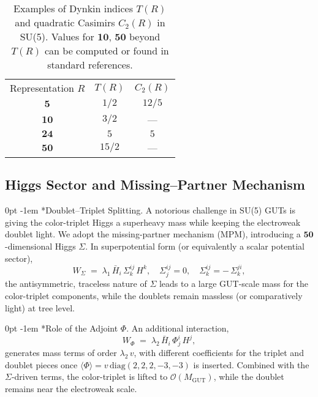 \documentclass[aps,prd,preprint,groupedaddress]{revtex4-2}
\makeatletter
\renewcommand{\paragraph}[1]{%
  \@startsection{paragraph}{4}{\z@}%
    {0pt}%
    {-1em}%
    {\normalfont\normalsize\itshape}*{#1}}
\makeatother
\begin{document}
\begin{table}[h!]
\centering
\begin{tabular}{c|c|c}
\toprule
Representation $R$ & $T(R)$ & $C_{2}(R)$ \\
$\mathbf{5}$ & $1/2$ & $12/5$ \\
$\mathbf{10}$ & $3/2$ & --- \\[3pt]
$\mathbf{24}$ & $5$ & $5$ \\[3pt]
$\mathbf{50}$ & $15/2$ & --- \\
\end{tabular}
\caption{Examples of Dynkin indices $T(R)$ and quadratic Casimirs $C_{2}(R)$ in SU(5).  
Values for $\mathbf{10}$, $\mathbf{50}$ beyond $T(R)$ can be computed or found in standard references.}
\label{tab:Indices}
\end{table}

\subsection{Higgs Sector and Missing--Partner Mechanism}
\label{subsec:higgs-mpm}

\paragraph{Doublet--Triplet Splitting.}
A notorious challenge in SU(5) GUTs is giving the color-triplet Higgs a superheavy mass while keeping the electroweak doublet light.  
We adopt the missing-partner mechanism (MPM), introducing a \(\mathbf{50}\)-dimensional Higgs \(\Sigma\).  
In superpotential form (or equivalently a scalar potential sector),
\begin{equation}
W_{\Sigma} \;=\; \lambda_1\,\bar{H}_i\,\Sigma^{ij}_k\,H^k,
\quad
\Sigma^{ij}_j = 0,
\quad
\Sigma^{ij}_k = -\,\Sigma^{ji}_k,
\label{eq:50-structure}
\end{equation}
the antisymmetric, traceless nature of \(\Sigma\) leads to a large GUT-scale mass for the color-triplet components, while the doublets remain massless (or comparatively light) at tree level.

\paragraph{Role of the Adjoint \(\Phi\).}
An additional interaction,
\begin{equation}
W_{\Phi} \;=\; \lambda_2\,\bar{H}_i\,\Phi^i_j\,H^j,
\label{eq:Phi-H-coupling}
\end{equation}
generates mass terms of order \(\lambda_2\,v\), with different coefficients for the triplet and doublet pieces once \(\langle\Phi\rangle = v\,\mathrm{diag}(2,2,2,-3,-3)\) is inserted.  
Combined with the \(\Sigma\)-driven terms, the color-triplet is lifted to \(\mathcal{O}(M_{\mathrm{GUT}})\), while the doublet remains near the electroweak scale.
\end{document}
